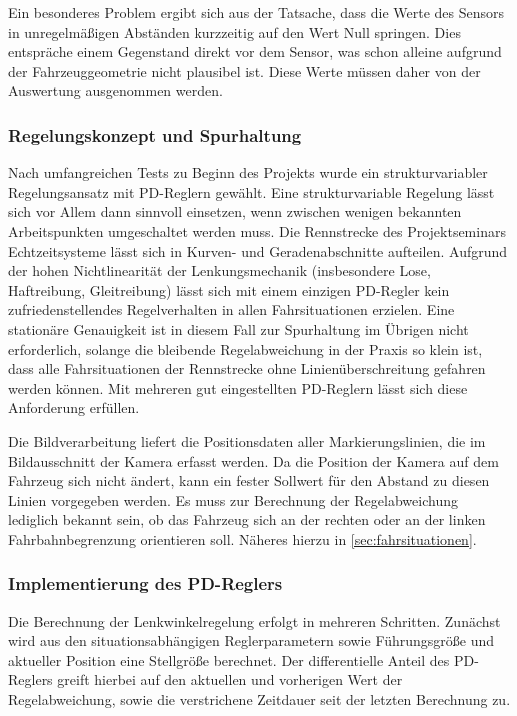 Ein besonderes Problem ergibt sich aus der Tatsache, dass die Werte des Sensors in unregelmäßigen Abständen kurzzeitig auf den Wert Null springen. Dies entspräche einem Gegenstand direkt vor dem Sensor, was schon alleine aufgrund der Fahrzeuggeometrie nicht plausibel ist. Diese Werte müssen daher von der Auswertung ausgenommen werden.



\subsubsection{Regelungskonzept und Spurhaltung}
\label{sec:wallfollower}
Nach umfangreichen Tests zu Beginn des Projekts wurde ein strukturvariabler Regelungsansatz mit PD-Reglern gewählt. Eine strukturvariable Regelung lässt sich vor Allem dann sinnvoll einsetzen, wenn zwischen wenigen bekannten Arbeitspunkten umgeschaltet werden muss. Die Rennstrecke des Projektseminars Echtzeitsysteme lässt sich in Kurven- und Geradenabschnitte aufteilen. Aufgrund der hohen Nichtlinearität der Lenkungsmechanik (insbesondere Lose, Haftreibung, Gleitreibung) lässt sich mit einem einzigen PD-Regler kein zufriedenstellendes Regelverhalten in allen Fahrsituationen erzielen. Eine stationäre Genauigkeit ist in diesem Fall zur Spurhaltung im Übrigen nicht erforderlich, solange die bleibende Regelabweichung in der Praxis so klein ist, dass alle Fahrsituationen der Rennstrecke ohne Linienüberschreitung gefahren werden können. Mit mehreren gut eingestellten PD-Reglern lässt sich diese Anforderung erfüllen.

Die Bildverarbeitung liefert die Positionsdaten aller Markierungslinien, die im Bildausschnitt der Kamera erfasst werden. Da die Position der Kamera auf dem Fahrzeug sich nicht ändert, kann ein fester Sollwert für den Abstand zu diesen Linien vorgegeben werden. Es muss zur Berechnung der Regelabweichung lediglich bekannt sein, ob das Fahrzeug sich an der rechten oder an der linken Fahrbahnbegrenzung orientieren soll. Näheres hierzu in \autoref{sec:fahrsituationen}.


\subsubsection{Implementierung des PD-Reglers}
\label{sec:pdregler}
Die Berechnung der Lenkwinkelregelung erfolgt in mehreren Schritten. Zunächst wird aus den situationsabhängigen Reglerparametern sowie Führungsgröße und aktueller Position eine Stellgröße berechnet. Der differentielle Anteil des PD-Reglers greift hierbei auf den aktuellen und vorherigen Wert der Regelabweichung, sowie die verstrichene Zeitdauer seit der letzten Berechnung zu.

